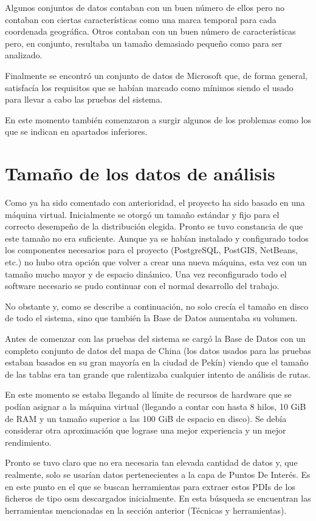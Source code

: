 Algunos conjuntos de datos contaban con un buen número de ellos pero no contaban con ciertas características como una marca temporal para cada coordenada geográfica. Otros contaban con un buen número de características pero, en conjunto, resultaba un tamaño demasiado pequeño como para ser analizado.

Finalmente se encontró un conjunto de datos de Microsoft que, de forma general, satisfacía los requisitos que se habían marcado como mínimos siendo el usado para llevar a cabo las pruebas del sistema.

En este momento también comenzaron a surgir algunos de los problemas como los  que se indican en apartados inferiores.


\section{Tamaño de los datos de análisis}
Como ya ha sido comentado con anterioridad, el proyecto ha sido basado en una máquina virtual. Inicialmente se otorgó un tamaño estándar y fijo para el correcto desempeño de la distribución elegida. Pronto se tuvo constancia de que este tamaño no era suficiente. Aunque ya se habían instalado y configurado todos los componentes necesarios para el proyecto (PostgreSQL, PostGIS, NetBeans, etc.) no hubo otra opción que volver a crear una nueva máquina, esta vez con un tamaño mucho mayor y de espacio dinámico. Una vez reconfigurado todo el software necesario se pudo continuar con el normal desarrollo del trabajo.

No obstante y, como se describe a continuación, no solo crecía el tamaño en disco de todo el sistema, sino que también la Base de Datos aumentaba su volumen.

Antes de comenzar con las pruebas del sistema se cargó la Base de Datos con un completo conjunto de datos del mapa de China (los datos usados para las pruebas estaban basados en su gran mayoría en la ciudad de Pekín) viendo que el tamaño de las tablas era tan grande que ralentizaba cualquier intento de análisis de rutas.

En este momento se estaba llegando al límite de recursos de hardware que se podían asignar a la máquina virtual (llegando a contar con hasta 8 hilos, 10 GiB de RAM y un tamaño superior a las 100 GiB de espacio en disco). Se debía considerar otra aproximación que lograse una mejor experiencia y un mejor rendimiento.

Pronto se tuvo claro que no era necesaria tan elevada cantidad de datos y, que realmente, solo se usarían datos pertenecientes a la capa de Puntos De Interés. Es en este punto en el que se buscan herramientas para extraer estos PDIs de los ficheros de tipo osm descargados inicialmente. En esta búsqueda se encuentran las herramientas mencionadas en la sección anterior (Técnicas y herramientas).


